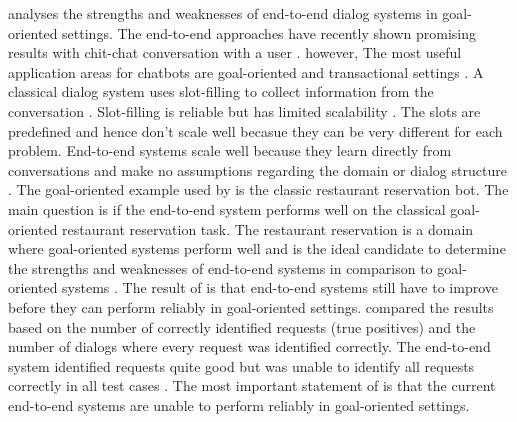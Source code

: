 \citet{bordes2016learning} analyses the strengths and weaknesses of end-to-end dialog systems in goal-oriented settings.
The end-to-end approaches have recently shown promising results with chit-chat conversation with a user \cite{bordes2016learning}.
however, The most useful application areas for chatbots are goal-oriented and transactional settings \cite{bordes2016learning}.
A classical dialog system uses slot-filling to collect information from the conversation \cite{bordes2016learning}.
Slot-filling is reliable but has limited scalability \cite{bordes2016learning}.
The slots are predefined and hence don't scale well becasue they can be very different for each problem. 
End-to-end systems scale well because they learn directly from conversations and make 
no assumptions regarding the domain or dialog structure \cite{bordes2016learning}. 
The goal-oriented example used by \citet{bordes2016learning} is the classic restaurant reservation bot.
The main question is if the end-to-end system performs well on the classical goal-oriented restaurant 
reservation task.
The restaurant reservation is a domain where goal-oriented systems perform well and is the ideal candidate
to determine the strengths and weaknesses of end-to-end systems in comparison to goal-oriented systems \cite{bordes2016learning}.
The result of \citet{bordes2016learning} is that end-to-end systems still have to improve before they 
can perform reliably in goal-oriented settings. 
\citet{bordes2016learning} compared the results based on the number of correctly identified requests (true positives)
and the number of dialogs where every request was identified correctly.
The end-to-end system identified requests quite good but was unable to identify all requests 
correctly in all test cases \cite{bordes2016learning}.
The most important statement of \citet{bordes2016learning} is that the current end-to-end systems are
unable to perform reliably in goal-oriented settings.

